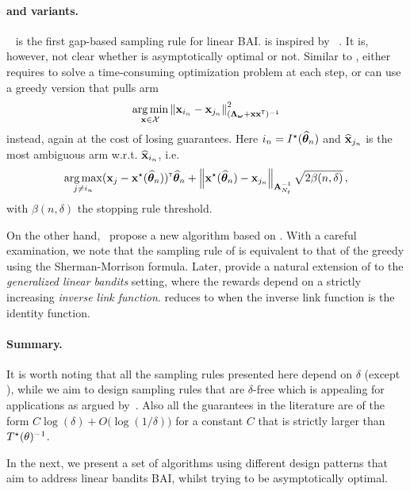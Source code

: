 \paragraph{\LGapE and variants.} \LGapE~\citep{xu2018linear} is the first gap-based sampling rule for linear BAI. \LGapE is inspired by \UGapE~\citep{gabillon2012ugape}. It is, however, not clear whether \LGapE is asymptotically optimal or not. Similar to \XYS, \LGapE either requires to solve a time-consuming optimization problem at each step, or can use a greedy version that pulls arm 
\[
    \operatorname*{arg\,min}_{{\bf x}\in\mathcal{X}} \left\lVert{\bf x}_{i_n}-{\bf x}_{j_n}\right\rVert_{({\boldsymbol \Lambda}_{{\boldsymbol \omega}}+{\bf x}{\bf x}^\mathsf{\scriptscriptstyle T})^{-1}}^2
\]
instead, again at the cost of losing guarantees. Here $i_n = I^\star(\widehat{{\boldsymbol \theta}}_n)$ and $\widehat{{\bf x}}_{j_n}$ is the most ambiguous arm w.r.t. $\widehat{{\bf x}}_{i_n}$, i.e. 
\[
    \operatorname*{arg\,max}_{j\neq i_n} ({\bf x}_{j}-{\bf x}^\star(\widehat{{\boldsymbol \theta}}_n))^\mathsf{\scriptscriptstyle T}\widehat{{\boldsymbol \theta}}_n + \left\lVert{\bf x}^\star(\widehat{{\boldsymbol \theta}}_n) - {\bf x}_{j_n}\right\rVert_{{\bf A}_{N_t}^{-1}} \sqrt{2\beta(n,\delta)}\,,
\]
with $\beta(n,\delta)$ the stopping rule threshold.

On the other hand,~\citet{zaki2019maxoverlap} propose a new algorithm based on \LUCB. With a careful examination, we note that the sampling rule of \GLUCB is equivalent to that of the greedy \LGapE using the Sherman-Morrison formula. Later, \citet{kazerouni2019glb} provide a natural extension of \LGapE to the \emph{generalized linear bandits} setting, where the rewards depend on a strictly increasing \emph{inverse link function}. \GLGapE reduces to \LGapE when the inverse link function is the identity function.

\paragraph{Summary.}
It is worth noting that all the sampling rules presented here depend on $\delta$ (except \XYS), while we aim to design sampling rules that are $\delta$-free which is appealing for applications as argued by~\citet{jun2016atlucb}. Also all the guarantees in the literature are of the form $C\log(\delta) + O\big(\log(1/\delta)\big)$ for a constant $C$ that is strictly larger than $T^{\star}(\theta)^{-1}$.

In the next, we present a set of algorithms using different design patterns that aim to address linear bandits BAI, whilst trying to be asymptotically optimal.
